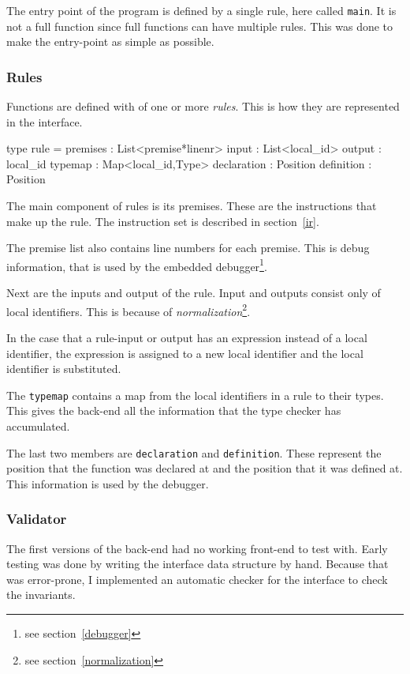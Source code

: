 The entry point of the program is defined by a single rule, here called \verb|main|.
It is not a full function since full functions can have multiple rules.
This was done to make the entry-point as simple as possible.

\subsubsection{Rules}

Functions are defined with of one or more \textit{rules}.
This is how they are represented in the interface.

\begin{FS}
type rule = {
  premises    : List<premise*linenr>
  input       : List<local_id>
  output      : local_id
  typemap     : Map<local_id,Type>
  declaration : Position
  definition  : Position
}
\end{FS}

The main component of rules is its premises.
These are the instructions that make up the rule.
The instruction set is described in section~\ref{ir}.

The premise list also contains line numbers for each premise.
This is debug information, that is used by the embedded debugger\footnote{see section~\ref{debugger}}.

Next are the inputs and output of the rule.
Input and outputs consist only of local identifiers.
This is because of \textit{normalization}\footnote{see section~\ref{normalization}}.

In the case that a rule-input or output has an expression instead of a local identifier,
 the expression is assigned to a new local identifier and the local identifier is substituted.

The \texttt{typemap} contains a map from the local identifiers in a rule to their types.
This gives the back-end all the information that the type checker has accumulated.

The last two members are \verb|declaration| and \verb|definition|.
These represent the position that the function was declared at and the position that it was defined at.
This information is used by the debugger.

\subsubsection{Validator}
The first versions of the back-end had no working front-end to test with.
Early testing was done by writing the interface data structure by hand.
Because that was error-prone, I implemented an automatic checker for the interface to check the invariants.

